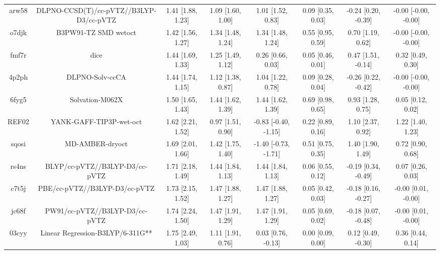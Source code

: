 \documentclass{article}
\begin{document}
\begin{center}
\begin{longtable}{|cccccccc|}
 arw58 &            DLPNO-CCSD(T)/cc-pVTZ//B3LYP-D3/cc-pVTZ &  1.41 [1.88, 1.23] &  1.09 [1.60, 1.00] &     1.01 [1.52, 0.83] &  0.09 [0.35, 0.03] &   -0.24 [0.20, -0.39] &  -0.00 [-0.00, -0.00] \\
 o7djk &                               B3PW91-TZ SMD wetoct &  1.42 [1.56, 1.27] &  1.34 [1.48, 1.24] &     1.34 [1.48, 1.24] &  0.55 [0.95, 0.59] &     0.70 [1.19, 0.62] &  -0.00 [-0.00, -0.00] \\
 fmf7r &                                               dice &  1.44 [1.69, 1.33] &  1.25 [1.49, 1.12] &     0.26 [0.66, 0.03] &  0.05 [0.46, 0.01] &    0.47 [1.51, -0.14] &     0.32 [0.49, 0.30] \\
 4p2ph &                                    DLPNO-Solv-ccCA &  1.44 [1.74, 1.15] &  1.12 [1.38, 0.87] &     1.04 [1.22, 0.78] &  0.09 [0.28, 0.04] &   -0.26 [0.22, -0.42] &  -0.00 [-0.00, -0.00] \\
 6fyg5 &                                    Solvation-M062X &  1.50 [1.65, 1.43] &  1.44 [1.62, 1.39] &     1.44 [1.62, 1.39] &  0.69 [0.98, 0.65] &     0.93 [1.28, 0.75] &     0.05 [0.12, 0.02] \\
 REF02 &                            YANK-GAFF-TIP3P-wet-oct &  1.62 [2.21, 1.52] &  0.97 [1.51, 0.90] &  -0.83 [-0.40, -1.15] &  0.22 [0.89, 0.16] &     1.10 [2.37, 0.92] &     1.22 [1.40, 1.23] \\
 sqosi &                                    MD-AMBER-dryoct &  1.69 [2.01, 1.66] &  1.42 [1.75, 1.40] &  -1.40 [-0.73, -1.71] &  0.51 [0.75, 0.35] &     1.40 [1.90, 1.49] &     0.72 [0.90, 0.68] \\
 rs4ns &                     BLYP/cc-pVTZ//B3LYP-D3/cc-pVTZ &  1.71 [2.18, 1.49] &  1.44 [1.84, 1.13] &     1.44 [1.84, 1.13] &  0.06 [0.55, 0.12] &   -0.19 [0.34, -0.49] &     0.07 [0.26, 0.03] \\
 c7t5j &                      PBE/cc-pVTZ//B3LYP-D3/cc-pVTZ &  1.73 [2.15, 1.52] &  1.47 [1.88, 1.27] &     1.47 [1.88, 1.27] &  0.05 [0.42, 0.03] &   -0.18 [0.16, -0.27] &   -0.00 [0.01, -0.00] \\
 jc68f &                     PW91/cc-pVTZ//B3LYP-D3/cc-pVTZ &  1.74 [2.24, 1.50] &  1.47 [1.91, 1.29] &     1.47 [1.91, 1.29] &  0.05 [0.69, 0.02] &   -0.18 [0.07, -0.48] &   -0.00 [0.01, -0.00] \\
 03cyy &                   Linear Regression-B3LYP/6-311G** &  1.75 [2.49, 1.03] &  1.11 [1.91, 0.76] &    0.03 [0.76, -0.13] &  0.00 [0.09, 0.00] &    0.12 [0.49, -0.30] &     0.36 [0.44, 0.14] \\

\end{longtable}
\end{center}
\end{document}
